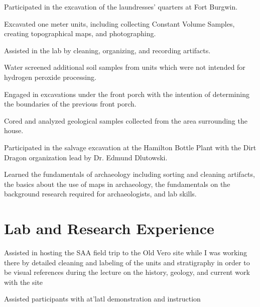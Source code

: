 \documentclass[letterpaper]{resume}
\begin{document}
\begin{compactitem}
\item Participated in the excavation of the laundresses' quarters at Fort Burgwin.
\item Excavated one meter units, including collecting Constant Volume Samples, creating topographical maps, and photographing.
\item Assisted in the lab by cleaning, organizing, and recording artifacts.
\item Water screened additional soil samples from units which were not intended for hydrogen peroxide processing.
\end{compactitem}

\begin{compactitem}
\item Engaged in excavations under the front porch with the intention of determining the boundaries of the previous front porch.
\item Cored and analyzed geological samples collected from the area surrounding the house.
\end{compactitem}

\begin{compactitem}
\item Participated in the salvage excavation at the Hamilton Bottle Plant with the Dirt Dragon organization lead by Dr. Edmund Dlutowski.
\item Learned the fundamentals of archaeology including sorting and cleaning artifacts, the basics about the use of maps in archaeology, the fundamentals on the background research required for archaeologists, and lab skills.
\end{compactitem}

\section{Lab and Research Experience}
\begin{compactitem}
\item Assisted in hosting the SAA field trip to the Old Vero site while I was working there by detailed cleaning and labeling of the units and stratigraphy in order to be visual references during the lecture on the history, geology, and current work with the site
\item Assisted participants with at'latl demonstration and instruction
\end{compactitem}
\end{document}
